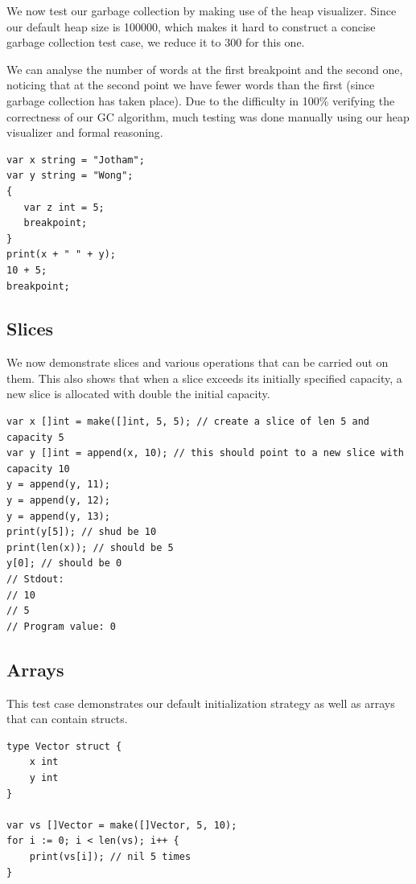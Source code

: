\documentclass{report}
\begin{document}
We now test our garbage collection by making use of the heap visualizer. Since our default heap size is 100000, which makes it hard to construct a concise garbage collection test case, we reduce it to 300 for this one.

We can analyse the number of words at the first breakpoint and the second one, noticing that at the second point we have fewer words than the first (since garbage collection has taken place). Due to the difficulty in 100\% verifying the correctness of our GC algorithm, much testing was done manually using our heap visualizer and formal reasoning.

\begin{verbatim}
var x string = "Jotham";
var y string = "Wong";
{
   var z int = 5;
   breakpoint;
}
print(x + " " + y);
10 + 5;
breakpoint;
\end{verbatim}

\subsection{Slices}

We now demonstrate slices and various operations that can be carried out on them. This also shows that when a slice exceeds its initially specified capacity, a new slice is allocated with double the initial capacity.

\begin{verbatim}
var x []int = make([]int, 5, 5); // create a slice of len 5 and capacity 5
var y []int = append(x, 10); // this should point to a new slice with capacity 10
y = append(y, 11);
y = append(y, 12);
y = append(y, 13);
print(y[5]); // shud be 10
print(len(x)); // should be 5
y[0]; // should be 0
// Stdout:
// 10
// 5
// Program value: 0
\end{verbatim}

\subsection{Arrays}

This test case demonstrates our default initialization strategy as well as arrays that can contain structs.

\begin{verbatim}
type Vector struct {
    x int
    y int
}

var vs []Vector = make([]Vector, 5, 10);
for i := 0; i < len(vs); i++ {
    print(vs[i]); // nil 5 times
}
\end{verbatim}
\end{document}

